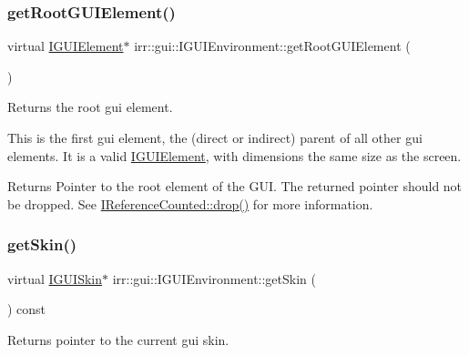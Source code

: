 \subsubsection{\texorpdfstring{get\+Root\+G\+U\+I\+Element()}{getRootGUIElement()}\hspace{0.1cm}{\footnotesize\ttfamily [2/2]}}
{\footnotesize\ttfamily virtual \hyperlink{classirr_1_1gui_1_1IGUIElement}{I\+G\+U\+I\+Element}$\ast$ irr\+::gui\+::\+I\+G\+U\+I\+Environment\+::get\+Root\+G\+U\+I\+Element (\begin{DoxyParamCaption}{ }\end{DoxyParamCaption})\hspace{0.3cm}{\ttfamily [pure virtual]}}



Returns the root gui element. 

This is the first gui element, the (direct or indirect) parent of all other gui elements. It is a valid \hyperlink{classirr_1_1gui_1_1IGUIElement}{I\+G\+U\+I\+Element}, with dimensions the same size as the screen. \begin{DoxyReturn}{Returns}
Pointer to the root element of the G\+UI. The returned pointer should not be dropped. See \hyperlink{classirr_1_1IReferenceCounted_a03856a09355b89d178090c4a5f738543}{I\+Reference\+Counted\+::drop()} for more information. 
\end{DoxyReturn}
\mbox{\label{classirr_1_1gui_1_1IGUIEnvironment_a54ce9072ea7b89cdaea65306e93ba90c}} 
\subsubsection{\texorpdfstring{get\+Skin()}{getSkin()}\hspace{0.1cm}{\footnotesize\ttfamily [1/2]}}
{\footnotesize\ttfamily virtual \hyperlink{classirr_1_1gui_1_1IGUISkin}{I\+G\+U\+I\+Skin}$\ast$ irr\+::gui\+::\+I\+G\+U\+I\+Environment\+::get\+Skin (\begin{DoxyParamCaption}{ }\end{DoxyParamCaption}) const\hspace{0.3cm}{\ttfamily [pure virtual]}}



Returns pointer to the current gui skin. 

